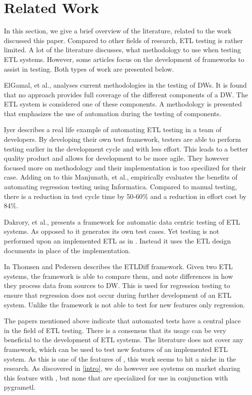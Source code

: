 \section{Related Work}\label{sect:RelatedWork}
In this section, we give a brief overview of the literature, related to the work discussed this paper. Compared to other fields of research, ETL testing is rather limited. A lot of the literature discusses, what methodology to use when testing ETL systems. However, some articles focus on the development of frameworks to assist in testing. Both types of work are presented below.

ElGamal, et al.,  \cite{elgamal2012towards} analyses current methodologies in the testing of DWs. It is found that no approach provides full coverage of the different components of a DW. The ETL system is considered one of these components. A methodology is presented that emphasizes the use of automation during the testing of components.

Iyer \cite{subuiyer2014} describes a real life example of automating ETL testing in a team of developers. By developing their own test framework, testers are able to perform testing earlier in the development cycle and with less effort. This leads to a better quality product and allows for development to be more agile. They however focused more on methodology and their implementation is too specilized for their case. Adding on to this Manjunath, et al., \cite{manjunath2012case} empirically evaluates the benefits of automating regression testing using Informatica. Compared to manual testing, there is a reduction in test cycle time by 50-60\% and a reduction in effort cost by 84\%.

Dakrory, et al.,  \cite{dakroryautomated} presents a framework for automatic data centric testing of ETL systems. As opposed to \FW{} it generates its own test cases. Yet testing is not performed upon an implemented ETL as in \FW{}. Instead it uses the ETL design documents in place of the implementation.

In \cite{thomsen2006etldiff} Thomsen and Pedersen describes the ETLDiff framework. Given two ETL systems, the framework is able to compare them, and note differences in how they process data from sources to DW. This is used for regression testing to ensure that regression does not occur during further development of an ETL system. Unlike \FW{} the framework is not able to test for new features only regression.

The papers mentioned above indicate that automated tests have a central place in the field of ETL testing. There is a consensus that its usage can be very beneficial to the development of ETL systems. The literature does not cover any framework, which can be used to test new features of an implemented ETL system. As this is one of the features of \FW{}, this work seems to hit a niche in the research. As discovered in \cref{intro}, we do however see systems on market sharing this feature with \FW{}, but none that are specialized for use in conjunction with pygrametl.
